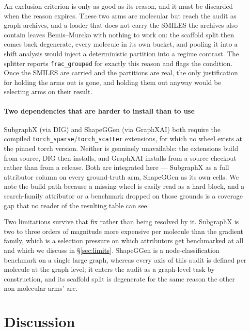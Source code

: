 An exclusion criterion is only as good as its reason, and it must be discarded
when the reason expires. These two arms are molecular but reach the audit as
graph archives, and a loader that does not carry the SMILES the archives also
contain leaves Bemis--Murcko with nothing to work on: the scaffold split then
comes back degenerate, every molecule in its own bucket, and pooling it into a
shift analysis would inject a deterministic partition into a regime contrast.
The splitter reports \texttt{frac\_grouped} for exactly this reason and flags
the condition. Once the SMILES are carried and the partitions are real, the
only justification for holding the arms out is gone, and holding them out
anyway would be selecting arms on their result.

\paragraph{Two dependencies that are harder to install than to use} SubgraphX
(via DIG) and ShapeGGen (via GraphXAI) both require the compiled
\texttt{torch\_\-sparse}/\texttt{torch\_\-scatter} extensions, for which no
wheel exists at the pinned torch version. Neither is genuinely unavailable:
the extensions build from source, DIG then installs, and GraphXAI installs from
a source checkout rather than from a release. Both are integrated here ---
SubgraphX as a full attributor column on every ground-truth arm, ShapeGGen as
its own cells. We note the build path because a missing wheel is easily read as
a hard block, and a search-family attributor or a benchmark dropped on those
grounds is a coverage gap that no reader of the resulting table can see.

Two limitations survive that fix rather than being resolved by it. SubgraphX is
two to three orders of magnitude more expensive per molecule than the gradient
family, which is a selection pressure on which attributors get benchmarked at
all and which we discuss in \S\ref{sec:limits}. ShapeGGen is a
node-classification benchmark on a single large graph, whereas every axis of
this audit is defined per molecule at the graph level; it enters the audit as a
graph-level task by construction, and its scaffold split is degenerate for the
same reason the other non-molecular arms' are.

\section{Discussion}

